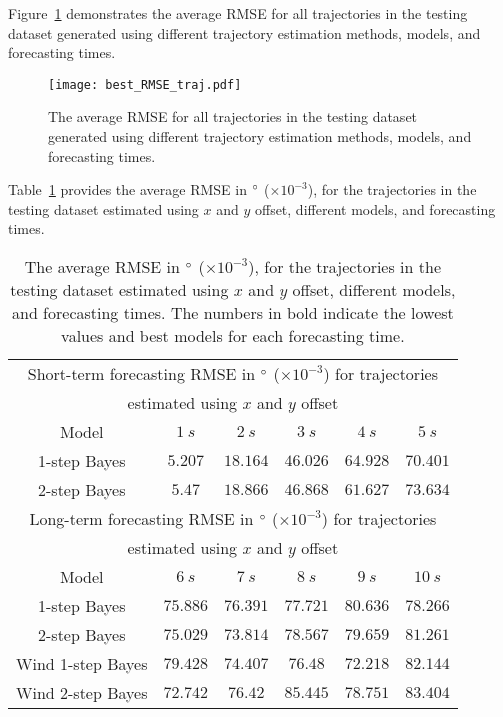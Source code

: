 \documentclass[preprint,12pt]{elsarticle}
\begin{document}
Figure~\ref{fig:best_RMSE_traj} demonstrates the average RMSE for all trajectories in the testing dataset generated using different trajectory estimation methods, models, and forecasting times.

\begin{figure}[!ht]
	\centering
	\texttt{[image: best\_RMSE\_traj.pdf]}
	\caption{The average RMSE for all trajectories in the testing dataset generated using different trajectory estimation methods, models, and forecasting times.}
	\label{fig:best_RMSE_traj}
\end{figure}

Table~\ref{tab:best_no_abs_RMSE} provides the average RMSE in $\degree$ ($\times 10^{-3}$), for the trajectories in the testing dataset estimated using $x$ and $y$ offset, different models, and forecasting times.

\begin{table}[!ht]
	\centering
	\begin{tabular}{|c|c|c|c|c|c|}
		\hline
		\multicolumn{6}{|c|}{Short-term forecasting RMSE in $\degree$ ($\times 10^{-3}$) for trajectories} \\ 
		\multicolumn{6}{|c|}{estimated using $x$ and $y$ offset} \\ \hline
		Model & $1 \ s$ & $2 \ s$ & $3 \ s$ & $4 \ s$ & $5 \ s$ \\ \hline
		1-step Bayes & $\mathbf{5.207}$ & $\mathbf{18.164}$ & $\mathbf{46.026}$ & $64.928$ & $\mathbf{70.401}$ \\ \hline
		2-step Bayes & $5.47$ & $18.866$ & $46.868$ & $\mathbf{61.627}$ & $73.634$ \\ \hline
		\multicolumn{6}{|c|}{Long-term forecasting RMSE in $\degree$ ($\times 10^{-3}$) for trajectories} \\ 
		\multicolumn{6}{|c|}{estimated using $x$ and $y$ offset} \\ \hline
		Model & $6 \ s$ & $7 \ s$ & $8 \ s$ & $9 \ s$ & $10 \ s$ \\ \hline
		1-step Bayes & $75.886$ & $76.391$ & $77.721$ & $80.636$ & $\mathbf{78.266}$ \\ \hline
		2-step Bayes & $75.029$ & $\mathbf{73.814}$ & $78.567$ & $79.659$ & $81.261$ \\ \hline
		Wind 1-step Bayes & $79.428$ & $74.407$ & $\mathbf{76.48}$ & $\mathbf{72.218}$ & $82.144$ \\ \hline
		Wind 2-step Bayes & $\mathbf{72.742}$ & $76.42$ & $85.445$ & $78.751$ & $83.404$ \\ \hline
	\end{tabular}
	\caption{The average RMSE in $\degree$ ($\times 10^{-3}$), for the trajectories in the testing dataset estimated using $x$ and $y$ offset, different models, and forecasting times. The numbers in bold indicate the lowest values and best models for each forecasting time.}
	\label{tab:best_no_abs_RMSE}
\end{table}
\end{document}
